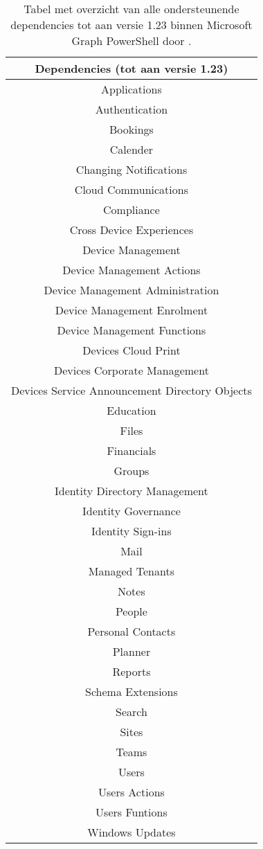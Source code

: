 \begin{table} %
    \small
    \centering
    \begin{tabular}{ |c| } 
        \hline
        \textbf{Dependencies (tot aan versie 1.23)} \\
        \hline
        Applications \\
        Authentication \\
        Bookings \\
        Calender \\
        Changing Notifications \\
        Cloud Communications \\
        Compliance \\
        Cross Device Experiences \\
        Device Management \\
        Device Management Actions \\
        Device Management Administration \\
        Device Management Enrolment \\
        Device Management Functions \\
        Devices Cloud Print \\
        Devices Corporate Management \\
        Devices Service Announcement
        Directory Objects \\
        Education \\
        Files \\
        Financials \\
        Groups \\
        Identity Directory Management \\
        Identity Governance \\
        Identity Sign-ins \\
        Mail \\
        Managed Tenants \\
        Notes \\
        People \\
        Personal Contacts \\
        Planner \\
        Reports \\
        Schema Extensions \\
        Search \\
        Sites \\
        Teams \\
        Users \\
        Users Actions \\
        Users Funtions \\
        Windows Updates \\
        \hline
    \end{tabular}
    \caption[Tabel Microsoft Graph dependencies]{Tabel met overzicht van alle ondersteunende dependencies tot aan versie 1.23 binnen Microsoft Graph PowerShell door \textcite{Microsoft2023k}.}
    \label{MSGDT}
\end{table}

